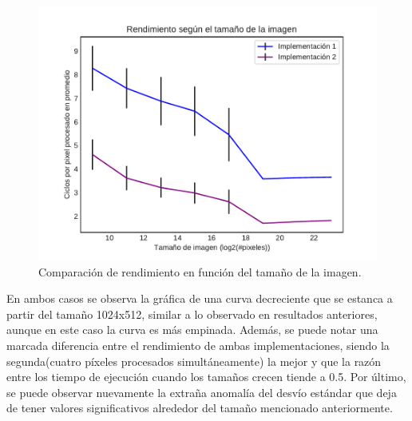 \documentclass[a4paper]{article}
\begin{document}
\begin{figure}[h!]
	\centering
	\includegraphics[scale=0.55]{img/ReforzarBrillo2vs4.pdf}
	\caption{Comparación de rendimiento en función del tamaño de la imagen.}
\end{figure}	
\justify
En ambos casos se observa la gráfica de una curva decreciente que se estanca a partir del tamaño 1024x512, similar a lo observado en resultados anteriores, aunque en este caso la curva es más empinada. Además, se puede notar una marcada diferencia entre el rendimiento de ambas implementaciones, siendo la segunda(cuatro píxeles procesados simultáneamente) la mejor y que la razón entre los tiempo de ejecución cuando los tamaños crecen tiende a 0.5. Por último, se puede observar nuevamente la extraña anomalía del desvío estándar que deja de tener valores significativos alrededor del tamaño mencionado anteriormente.
\newpage
\end{document}
